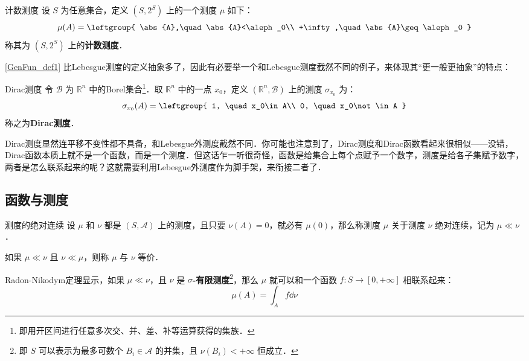 \begin{example}{计数测度}
设 $S$ 为任意集合，定义 $(S, 2^S)$ 上的一个测度 $\mu$ 如下：
\begin{equation}
\mu(A)=
\leftgroup{
    \abs{A},\quad \abs{A}<\aleph_0\\
    +\infty,\quad \abs{A}\geq\aleph_0
}
\end{equation}
称其为 $(S, 2^S)$ 上的\textbf{计数测度}．
\end{example}

\autoref{GenFun_def1} 比Lebesgue测度的定义抽象多了，因此有必要举一个和Lebesgue测度截然不同的例子，来体现其“更一般更抽象”的特点：

\begin{example}{Dirac测度}
令 $\mathcal{B}$ 为 $\mathbb{R}^n$ 中的Borel集合\footnote{即用开区间进行任意多次交、并、差、补等运算获得的集族．}．取 $\mathbb{R}^n$ 中的一点 $x_0$，定义 $(\mathbb{R}^n, \mathcal{B})$ 上的测度 $\sigma_{x_0}$ 为：
\begin{equation}
\sigma_{x_0}(A)=\leftgroup{
    1, \quad x_0\in A\\
    0, \quad x_0\not\in A
}
\end{equation}
称之为\textbf{Dirac测度}．
\end{example}

Dirac测度显然连平移不变性都不具备，和Lebesgue外测度截然不同．你可能也注意到了，Dirac测度和Dirac函数看起来很相似——没错，Dirac函数本质上就不是一个函数，而是一个测度．但这话乍一听很奇怪，函数是给集合上每个点赋予一个数字，测度是给各子集赋予数字，两者是怎么联系起来的呢？这就需要利用Lebesgue外测度作为脚手架，来衔接二者了．





\subsection{函数与测度}




\begin{definition}{测度的绝对连续}
设 $\mu$ 和 $\nu$ 都是 $(S, \mathcal{A})$ 上的测度，且只要 $\nu(A)=0$，就必有 $\mu(0)$，那么称测度 $\mu$ 关于测度 $\nu$ 绝对连续，记为 $\mu\ll\nu$．

如果 $\mu\ll\nu$ 且 $\nu\ll\mu$，则称 $\mu$ 与 $\nu$ 等价．
\end{definition}



Radon-Nikodym定理显示，如果 $\mu\ll\nu$，且 $\nu$ 是 $\sigma$\textbf{-有限测度}\footnote{即 $S$ 可以表示为最多可数个 $B_i\in\mathcal{A}$ 的并集，且 $\nu(B_i)<+\infty$ 恒成立．}，那么 $\mu$ 就可以和一个函数 $f:S\to [0, +\infty]$ 相联系起来：
\begin{equation}
\mu(A) = \int_A f \dd \nu
\end{equation}

